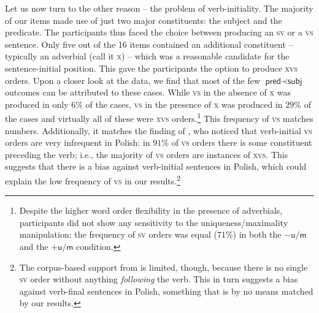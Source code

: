 \documentclass[output=paper]{langscibook}
\begin{document}
Let us now turn to the other reason -- the problem of verb-initiality. The majority of our items made use of just two major constituents: the subject and the predicate. The participants thus faced the choice between producing an \textsc{sv} or a \textsc{vs} sentence. Only five out of the 16 items contained an additional constituent -- typically an adverbial (call it \textsc{x}) -- which was a reasonable candidate for the sentence-initial position. This gave the participants the option to produce \textsc{xvs} orders. Upon a closer look at the data, we find that most of the few $\textsf{pred}\prec\textsf{subj}$ outcomes can be attributed to these cases. While \textsc{vs} in the absence of \textsc{x} was produced in only $6\%$ of the cases, \textsc{vs} in the presence of \textsc{x} was produced in $29\%$ of the cases and virtually all of these were \textsc{xvs} orders.\footnote{Despite the higher word order flexibility in the presence of adverbials, participants did not show any sensitivity to the uniqueness/maximality manipulation: the frequency of \textsc{sv} orders was equal ($71\%$) in both the $-\textsf{u/m}$ and the $+\textsf{u/m}$ condition.\label{sim-dem:fn:adv}} This frequency of \textsc{vs} matches  numbers. Additionally, it matches the finding of \citet{Jacennik.Dryer1992}, who noticed that verb-initial \textsc{vs} orders are very infrequent in Polish: in $91\%$ of \textsc{vs} orders there is some constituent preceding the verb; i.e., the majority of \textsc{vs} orders are instances of \textsc{xvs}. This suggests that there is a bias against verb-initial sentences in Polish, which could explain the low frequency of \textsc{vs} in our results.\footnote{The corpus-based support from \citet{Jacennik.Dryer1992} is limited, though, because there is no single \textsc{sv} order without anything \textit{following} the verb. This in turn suggests a bias against verb-final sentences in Polish, something that is by no means matched by our results.\label{sim-dem:fn:v-final}}
\end{document}
